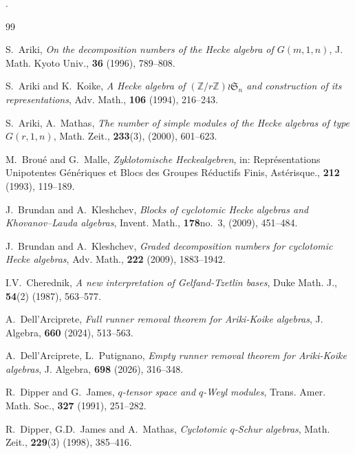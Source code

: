 \documentclass[a4paper,10pt]{amsart}
\theoremstyle{plain}
\def\Z{{\mathbb Z}}
\def\Sym{\mathfrak{S}}
\theoremstyle{plain}
\numberwithin{equation}{section}
\begin{document}
   .
	








\begin{thebibliography}{99}

 {\sc S.~Ariki}, {\em On the decomposition numbers of the Hecke algebra of $G(m,1,n)$}, J. Math. Kyoto Univ., {\bf 36} (1996), 789--808.

 {\sc S.~Ariki and K.~Koike}, {\em  A Hecke algebra of $(\Z/r\Z)\wr\Sym_n$ and construction of its representations}, Adv. Math., {\bf 106} (1994), 216--243.

 {\sc S.~Ariki, A.~Mathas}, {\em The number of simple modules of the Hecke algebras of type $G(r,1,n)$}, Math. Zeit., {\bf 233}(3), (2000), 601--623.



{\sc M.~Brou{\'e} and G.~Malle}, {\em Zyklotomische {H}eckealgebren}, in: Repr{\'e}sentations Unipotentes G{\'e}n{\'e}riques et Blocs des Groupes R{\'e}ductifs Finis,
  Ast\'erisque., {\bf 212} (1993), 119--189.

{\sc J.~Brundan and A.~Kleshchev}, {\em Blocks of cyclotomic Hecke algebras and Khovanov--Lauda algebras}, Invent. Math., {\bf 178}no.~3, (2009), 451--484.

{\sc J.~Brundan and A.~Kleshchev}, {\em Graded decomposition numbers for cyclotomic Hecke algebras}, Adv. Math., {\bf 222} (2009), 1883--1942.

 {\sc I.V.~Cherednik}, {\em A new interpretation of Gelfand-Tzetlin bases}, Duke Math. J., {\bf 54}(2) (1987), 563--577.

{\sc A.~Dell'Arciprete}, {\em Full runner removal theorem for {A}riki-{K}oike algebras}, J. Algebra, {\bf 660} (2024), 513--563.

{\sc A.~Dell'Arciprete, L.~Putignano}, {\em Empty runner removal theorem for Ariki-Koike algebras}, J. Algebra, {\bf 698} (2026), 316--348.

{\sc R.~Dipper and G.~James}, {\em $q$-tensor space and $q$-Weyl modules}, Trans. Amer. Math. Soc., {\bf 327} (1991), 251--282.


 {\sc R.~Dipper, G.D.~James and A.~Mathas}, {\em Cyclotomic $q$-Schur algebras},  Math. Zeit., {\bf 229}(3) (1998), 385--416.


\end{thebibliography}
\end{document}
